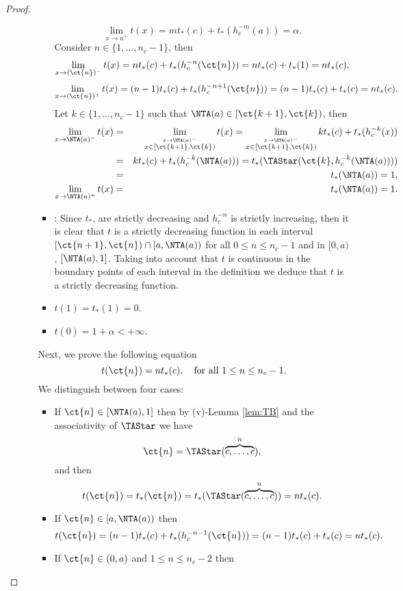 \begin{proof}
\begin{enumerate}[label=(\roman*)]
\begin{itemize}
\begin{itemize}
$$				$$
				$$
				\lim_{x \to a^+} t(x) = mt_*(c)+t_*(h_c^{-m}(a)) = \alpha.
				$$
				Consider $n \in \{1,\dots,n_c-1\}$, then
				$$\lim_{x \to (\ct{n})^{-}} t(x) = nt_*(c)+t_*(h_c^{-n}(\ct{n})) = nt_*(c)+t_*(1)=nt_*(c),$$
				$$\lim_{x \to (\ct{n})^{+}} t(x) = (n-1)t_*(c)+t_*(h_c^{-n+1}(\ct{n})) = (n-1)t_*(c)+t_*(c)=nt_*(c).$$
				Let $k \in \{1,\dots,n_c-1\}$ such that $\NTA(a) \in [\ct{k+1},\ct{k})$, then
				\begin{eqnarray*}
					\lim_{x \to \NTA(a)^{-}} t(x) &=& \lim_{\stackrel{x \to \NTA(a)^{-}}{x \in [\ct{k+1},\ct{k})}} t(x)  = \lim_{\stackrel{x \to \NTA(a)^{-}}{x \in [\ct{k+1},\ct{k})}} kt_*(c)+t_*(h_c^{-k}(x)) \\
					&=& kt_*(c)+t_*(h_c^{-k}(\NTA(a))) = t_*(\TAStar(\ct{k},h_c^{-k}(\NTA(a))))\\
					&=& t_*(\NTA(a))=1, \\
				\lim_{x \to \NTA(a)^{+}} t(x) &=& t_*(\NTA(a))=1.
				\end{eqnarray*}
				\item \underline{}: Since $t_*$, \NTA are strictly decreasing and $h_c^{-n}$ is strictly increasing, then it is clear that $t$ is a strictly decreasing function in each interval $[\ct{n+1},\ct{n}) \cap [a,\NTA(a))$ for all $0 \leq n \leq n_c-1$ and in $[0,a)$, $[\NTA(a),1]$. Taking into account that $t$ is continuous in the boundary points of each interval in the definition  we deduce that $t$ is a strictly decreasing function.
				\item $t(1)=t_*(1)=0$.
				\item $t(0)=1+\alpha < + \infty$.
			\end{itemize}
			Next, we prove the following equation
			\begin{equation}\label{eq:t(cn)=nt(c)}
				t(\ct{n})=nt_*(c), \quad \text{for all } 1 \leq n \leq n_c-1.
			\end{equation}
			We distinguish between four cases:
			\begin{itemize}
				\item If $ \ct{n} \in [\NTA(a),1]$ then by (v)-Lemma \ref{lem:TB} and the associativity of $\TAStar$ we have
				$$\ct{n}=\TAStar(\overbrace{c,\dots,c}^{n}),$$
				and then
				$$t(\ct{n})=t_*(\ct{n}) = t_*(\TAStar(\overbrace{c,\dots,c}^{n}))=nt_*(c).$$
				\item If $\ct{n} \in [a,\NTA(a))$ then
				$$t(\ct{n})=(n-1)t_*(c)+t_*(h_c^{-{n-1}}(\ct{n})) = (n-1)t_*(c) + t_*(c)=nt_*(c).$$
				\item If $\ct{n} \in (0,a)$ and $1 \leq n \leq n_c-2$ then

\end{itemize}
\end{itemize}
\end{enumerate}
\end{proof}
